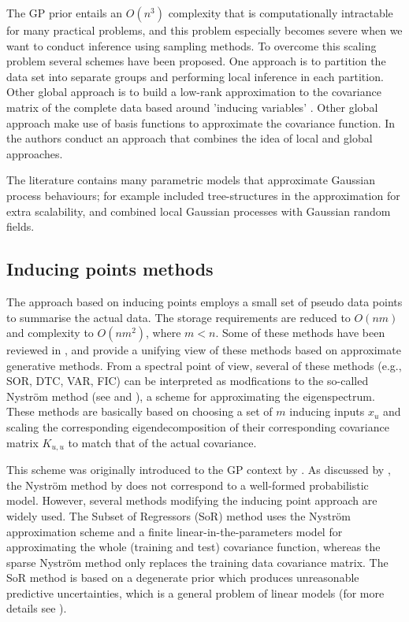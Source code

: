 \documentclass[]{interact}
\theoremstyle{plain}%
\theoremstyle{definition}
\theoremstyle{remark}
\begin{document}
The GP prior entails an $O(n^3)$ complexity that is computationally intractable for many practical problems, and this problem especially becomes severe when we want to conduct inference using sampling methods. To overcome this scaling problem several schemes have been proposed. One approach is to partition the data set into separate groups \citep{snelson2007local, urtasun2008sparse} and performing local inference in each partition. Other global approach is to build a low-rank approximation to the covariance matrix of the complete data based around 'inducing variables' \citep{quinonero2005unifying,bui2017unifying}. Other global approach make use of basis functions to approximate the covariance function. In \cite{snelson2007local} the authors conduct an approach that combines the idea of local and global approaches.

The literature contains many parametric models that approximate Gaussian process behaviours; for example \cite{bui2014tree} included  tree-structures in the approximation for extra scalability, and \cite{moore2015gaussian} combined local Gaussian
processes with Gaussian random fields.

\subsection{Inducing points methods}

The approach based on inducing points employs a small set of pseudo data points to summarise the actual data. The storage requirements are reduced to $O(nm)$ and complexity to $O(nm^2)$, where $m < n$. Some of these methods have been reviewed in \cite{rasmussen2006gaussian}, and \cite{quinonero2005unifying} provide a unifying view of these methods based on approximate generative methods. From a spectral point of view, several of these methods (e.g., SOR, DTC, VAR, FIC) can be interpreted as modfications to the so-called Nystr{\"o}m method (see \cite{arthur1979baker} and \cite{williams2001using}), a scheme for approximating the eigenspectrum. These methods are basically based on choosing a set of $m$ inducing inputs $x_u$ and scaling the corresponding eigendecomposition of their corresponding covariance matrix $K_{u,u}$ to match that of the actual covariance. 

This scheme was originally introduced to the GP context by \cite{williams2001using}. As discussed by \cite{quinonero2005unifying}, the Nystr\"om method by \cite{williams2001using} does not correspond to a well-formed probabilistic model. However, several methods modifying the inducing point approach are widely used. The Subset of Regressors (SoR) \citep{smola2001sparse} method uses the Nystr\"om approximation scheme and a finite linear-in-the-parameters model for approximating the whole (training and test) covariance function, whereas the sparse Nystr\"om method \citep{williams2001using} only replaces the training data covariance matrix. The SoR method is based on a degenerate prior which produces unreasonable predictive uncertainties, which is a general problem of linear models (for more details see \cite{rasmussen2006gaussian}). 
\end{document}

